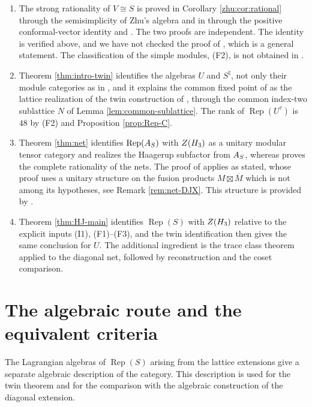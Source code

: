 \documentclass[leqno]{article}
\let\cal\relax
\newcommand{\cal}{\mathcal}
\newcommand{\ovl}{\overline}
\DeclareMathOperator{\Rep}{Rep}
\numberwithin{equation}{section}
\begin{document}
\begin{enumerate}
\item The strong rationality of $V \cong S$ is proved in Corollary \ref{zhu:cor:rational} through the semisimplicity of Zhu's algebra and in \cite[Corollary 8.2]{DJX26} through the positive conformal-vector identity and \cite[Theorem 3.1]{DJX26}. The two proofs are independent. The identity \cite[(8.2)]{DJX26} is verified above, and we have not checked the proof of \cite[Theorem 3.1]{DJX26}, which is a general statement. The classification of the simple modules, (F2), is not obtained in \cite{DJX26}.
\item Theorem \ref{thm:intro-twin} identifies the algebras $U$ and $S^\natural$, not only their module categories as in \cite[Proposition 9.2]{DJX26}, and it explains the common fixed point of \cite[Theorem 7.3]{DJX26} as the lattice realization of the twin construction of \cite[Section 12]{Arh26}, through the common index-two sublattice $N$ of Lemma \ref{lem:common-sublattice}. The rank of $\Rep(U^\tau)$ is $48$ by (F2) and Proposition \ref{prop:Rep-C}.
\item Theorem \ref{thm:net} identifies $\Rep(\cal A_S)$ with $Z(\cal H_3)$ as a unitary modular tensor category and realizes the Haagerup subfactor from $\cal A_S$, whereas \cite[Theorem 10.1]{DJX26} proves the complete rationality of the nets. The proof of \cite[Theorem 10.1]{DJX26} applies \cite[Corollary 4.24]{Ten24} as stated, whose proof uses a unitary structure on the fusion products $M \boxtimes \ovl M$ which is not among its hypotheses, see Remark \ref{rem:net-DJX}. This structure is provided by \cite[Proposition 5.2]{ArhII}.
\item Theorem \ref{thm:HJ-main} identifies $\Rep(S)$ with $Z(\cal H_3)$ relative to the explicit inputs (I1), (F1)--(F3), and the twin identification then gives the same conclusion for $U$. The additional ingredient is the trace class theorem applied to the diagonal net, followed by reconstruction and the coset comparison.
\end{enumerate}


\section{The algebraic route and the equivalent criteria}
\label{sec:algebraic-route}


The Lagrangian algebras of $\Rep(S)$ arising from the lattice extensions give a separate algebraic description of the category. This description is used for the twin theorem and for the comparison with the algebraic construction of the diagonal extension.
\end{document}

